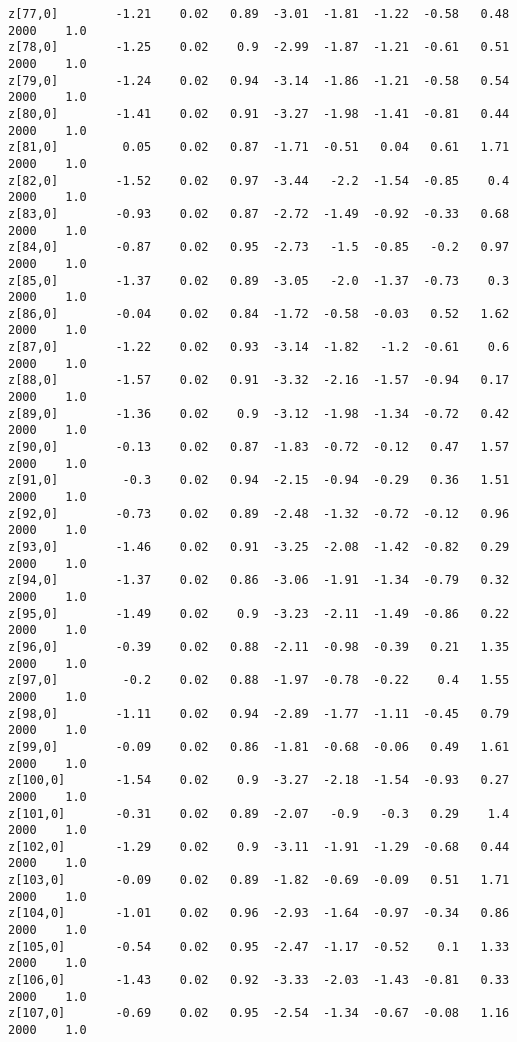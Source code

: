 \documentclass[11pt]{article}
\begin{document}
\begin{Verbatim}[commandchars=\\\{\}]
z[77,0]        -1.21    0.02   0.89  -3.01  -1.81  -1.22  -0.58   0.48   2000    1.0
z[78,0]        -1.25    0.02    0.9  -2.99  -1.87  -1.21  -0.61   0.51   2000    1.0
z[79,0]        -1.24    0.02   0.94  -3.14  -1.86  -1.21  -0.58   0.54   2000    1.0
z[80,0]        -1.41    0.02   0.91  -3.27  -1.98  -1.41  -0.81   0.44   2000    1.0
z[81,0]         0.05    0.02   0.87  -1.71  -0.51   0.04   0.61   1.71   2000    1.0
z[82,0]        -1.52    0.02   0.97  -3.44   -2.2  -1.54  -0.85    0.4   2000    1.0
z[83,0]        -0.93    0.02   0.87  -2.72  -1.49  -0.92  -0.33   0.68   2000    1.0
z[84,0]        -0.87    0.02   0.95  -2.73   -1.5  -0.85   -0.2   0.97   2000    1.0
z[85,0]        -1.37    0.02   0.89  -3.05   -2.0  -1.37  -0.73    0.3   2000    1.0
z[86,0]        -0.04    0.02   0.84  -1.72  -0.58  -0.03   0.52   1.62   2000    1.0
z[87,0]        -1.22    0.02   0.93  -3.14  -1.82   -1.2  -0.61    0.6   2000    1.0
z[88,0]        -1.57    0.02   0.91  -3.32  -2.16  -1.57  -0.94   0.17   2000    1.0
z[89,0]        -1.36    0.02    0.9  -3.12  -1.98  -1.34  -0.72   0.42   2000    1.0
z[90,0]        -0.13    0.02   0.87  -1.83  -0.72  -0.12   0.47   1.57   2000    1.0
z[91,0]         -0.3    0.02   0.94  -2.15  -0.94  -0.29   0.36   1.51   2000    1.0
z[92,0]        -0.73    0.02   0.89  -2.48  -1.32  -0.72  -0.12   0.96   2000    1.0
z[93,0]        -1.46    0.02   0.91  -3.25  -2.08  -1.42  -0.82   0.29   2000    1.0
z[94,0]        -1.37    0.02   0.86  -3.06  -1.91  -1.34  -0.79   0.32   2000    1.0
z[95,0]        -1.49    0.02    0.9  -3.23  -2.11  -1.49  -0.86   0.22   2000    1.0
z[96,0]        -0.39    0.02   0.88  -2.11  -0.98  -0.39   0.21   1.35   2000    1.0
z[97,0]         -0.2    0.02   0.88  -1.97  -0.78  -0.22    0.4   1.55   2000    1.0
z[98,0]        -1.11    0.02   0.94  -2.89  -1.77  -1.11  -0.45   0.79   2000    1.0
z[99,0]        -0.09    0.02   0.86  -1.81  -0.68  -0.06   0.49   1.61   2000    1.0
z[100,0]       -1.54    0.02    0.9  -3.27  -2.18  -1.54  -0.93   0.27   2000    1.0
z[101,0]       -0.31    0.02   0.89  -2.07   -0.9   -0.3   0.29    1.4   2000    1.0
z[102,0]       -1.29    0.02    0.9  -3.11  -1.91  -1.29  -0.68   0.44   2000    1.0
z[103,0]       -0.09    0.02   0.89  -1.82  -0.69  -0.09   0.51   1.71   2000    1.0
z[104,0]       -1.01    0.02   0.96  -2.93  -1.64  -0.97  -0.34   0.86   2000    1.0
z[105,0]       -0.54    0.02   0.95  -2.47  -1.17  -0.52    0.1   1.33   2000    1.0
z[106,0]       -1.43    0.02   0.92  -3.33  -2.03  -1.43  -0.81   0.33   2000    1.0
z[107,0]       -0.69    0.02   0.95  -2.54  -1.34  -0.67  -0.08   1.16   2000    1.0

\end{Verbatim}
\end{document}
